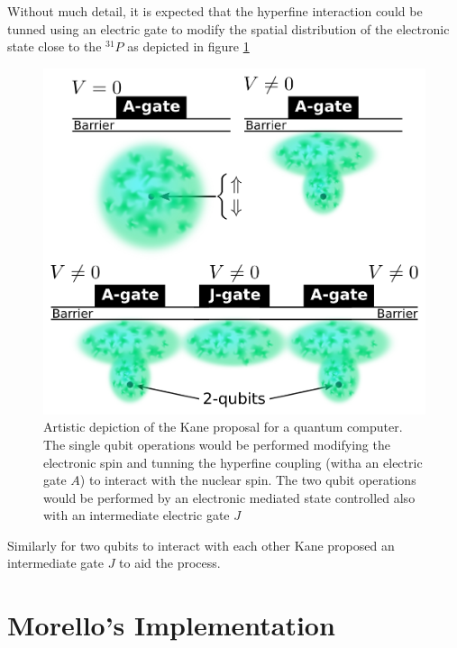 Without much detail, it is expected that the hyperfine interaction could be tunned using an electric gate to modify the spatial distribution of the electronic state close to the $^{31}P$ as depicted in figure \ref{kane}
\begin{figure}[h!]
\centering
\includegraphics{chapter03/figures/kane.png}
\vspace{-5pt}
\caption{Artistic depiction of the Kane proposal for a quantum computer. The single qubit operations would be performed modifying the electronic spin and tunning the hyperfine coupling (witha an electric gate $A$) to interact with the nuclear spin. The two qubit operations would be performed by an electronic mediated state controlled also with an intermediate electric gate $J$}
\label{kane}
\end{figure}
\FloatBarrier
Similarly for two qubits to interact with each other Kane proposed an intermediate gate $J$ to aid the process.

\section{Morello's Implementation}



